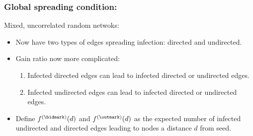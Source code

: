 \begin{frame}
  \frametitle{Global spreading condition:}

  \begin{block}{Mixed, uncorrelated random netwoks:}
  \begin{itemize}
  \item<1-> 
    Now have two types of edges spreading infection: directed and undirected.
  \item<2-> 
    Gain ratio now more complicated: 
    \begin{enumerate}
    \item 
      Infected directed edges can lead to infected directed or undirected edges.
    \item 
      Infected undirected edges can lead to infected directed or undirected edges.
    \end{enumerate}
  \item<3->
    Define 
    $
    f^{\textnormal{(\bidmark)}}(d)
    $
    and 
    $
    f^{\textnormal{(\outmark)}}(d)
    $
    as the expected number of infected undirected and directed 
    edges leading to nodes a distance $d$ from seed.
  \end{itemize}
  \end{block}

\end{frame}

